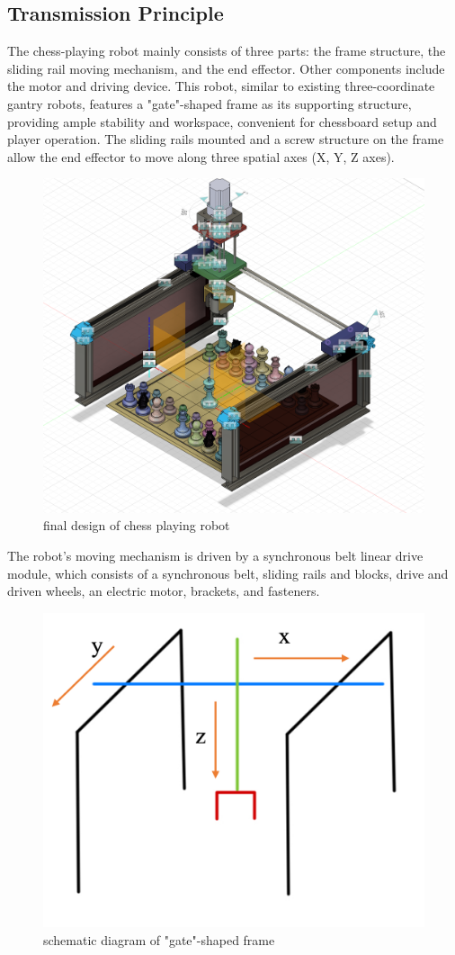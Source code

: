 \documentclass[10pt, a4paper, twocolumn]{article}
\begin{document}
\subsection{Transmission Principle}
The chess-playing robot mainly consists of three parts: the frame structure, the sliding rail moving mechanism, and the end effector. Other components include the motor and driving device. This robot, similar to existing three-coordinate gantry robots, features a "gate"-shaped frame as its supporting structure, providing ample stability and workspace, convenient for chessboard setup and player operation. The sliding rails mounted and a screw structure on the frame allow the end effector to move along three spatial axes (X, Y, Z axes).

\begin{figure}
    \centering
    \includegraphics[width=0.8\linewidth]{final design.png}
    \caption{final design of chess playing robot}
    \label{fig:final design}
\end{figure}

The robot's moving mechanism is driven by a synchronous belt linear drive module, which consists of a synchronous belt, sliding rails and blocks, drive and driven wheels, an electric motor, brackets, and fasteners.

\begin{figure}
    \centering
    \includegraphics[width=0.5\linewidth]{schematic diagram.png}
    \caption{schematic diagram of "gate"-shaped frame}
    \label{fig:schematic diagram}
\end{figure}
\end{document}
